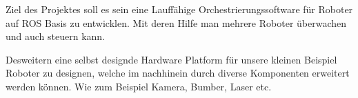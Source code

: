 \begin{flushleft}
    Ziel des Projektes soll es sein eine
    Lauffähige Orchestrierungssoftware für Roboter auf ROS Basis zu entwicklen.
    Mit deren Hilfe man mehrere Roboter überwachen und auch steuern kann.

    Desweitern eine selbst designde Hardware Platform für unsere kleinen Beispiel Roboter zu designen, welche im
    nachhinein durch diverse Komponenten erweitert werden können. Wie zum Beispiel Kamera, Bumber, Laser etc.
\end{flushleft}